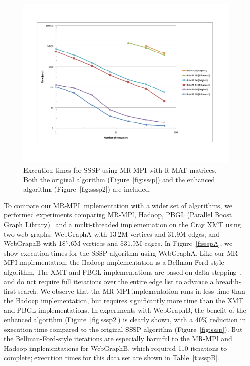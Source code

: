 \begin{figure}[htb]
\includegraphics[width=\textwidth]{fig_sssp.pdf}
\caption{Execution times for SSSP using MR-MPI with R-MAT matrices.  
Both the original algorithm (Figure~\ref{fig:sssp}) and the enhanced 
algorithm (Figure~\ref{fig:sssp2}) are included.}
\label{f:sssp}
\end{figure}

To compare our MR-MPI implementation with a wider set of algorithms,
we performed experiments comparing MR-MPI, Hadoop, PBGL (Parallel
Boost Graph Library)~\cite{PBGL} and a multi-threaded implementation
on the Cray XMT using two web graphs: {WebGraphA} with 13.2M vertices
and 31.9M edges, and {WebGraphB} with 187.6M vertices and 531.9M
edges.  In Figure~\ref{f:ssspA}, we show execution times for the SSSP
algorithm using {WebGraphA}.  Like our MR-MPI implementation, the
Hadoop implementation is a Bellman-Ford-style~\cite{Bellman58,Ford62}
algorithm.  The XMT and PBGL implementations are based on
delta-stepping~\cite{MeyerSanders98}, and do not require full
iterations over the entire edge list to advance a breadth-first
search.  We observe that the MR-MPI implementation runs in less time
than the Hadoop implementation, but requires significantly more time
than the XMT and PBGL implementations.  In experiments with
{WebGraphB}, the benefit of the enhanced algorithm
(Figure~\ref{fig:sssp2}) is clearly shown, with a 40\% reduction in
execution time compared to the original SSSP algorithm
(Figure~\ref{fig:sssp}).  But the Bellman-Ford-style iterations are
especially harmful to the MR-MPI and Hadoop implementations for
{WebGraphB}, which required 110 iterations to complete; execution
times for this data set are shown in Table~\ref{t:ssspB}.

